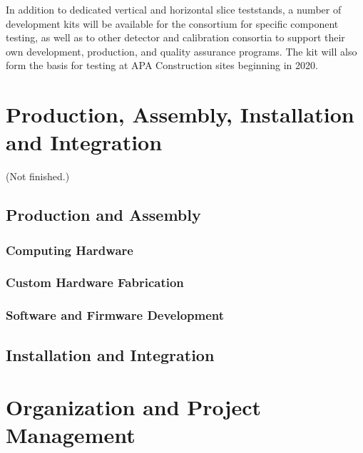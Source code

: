 In addition to dedicated vertical and horizontal slice teststands, a number of
 development kits will be available for the consortium for
specific component testing, as well as to other detector and
calibration consortia to support their own development, production, and quality assurance programs. The  
kit will also form the basis for testing at APA Construction sites beginning in 2020. 

\section{Production, Assembly, Installation and Integration}
\label{sec:sp-daq:production}

(Not finished.)

\subsection{Production and Assembly}

\subsubsection{Computing Hardware}

\subsubsection{Custom Hardware Fabrication}

\subsubsection{Software and Firmware Development}

\subsection{Installation and Integration}


\section{Organization and Project Management}

